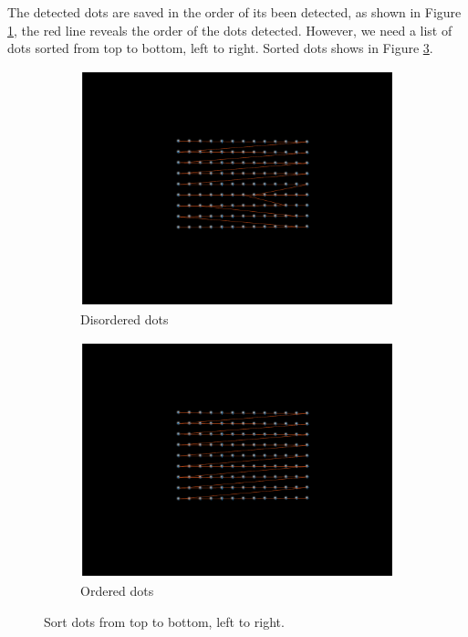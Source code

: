 The detected dots are saved in the order of its been detected, as shown in Figure \ref{fig:dot_disorder}, the red line reveals the order of the dots detected. However, we need a list of dots sorted from top to bottom, left to right. Sorted dots shows in Figure \ref{fig:dot_ordered}.

\begin{figure}[h!]
	\centering
	\begin{subfigure}[t]{0.48\linewidth}
		\centering
		\includegraphics[width=1\linewidth]{figures/part2/dot_disorder.eps}
		\caption{Disordered dots}
		\label{fig:dot_disorder}
	\end{subfigure}
	\begin{subfigure}[t]{0.48\linewidth}
		\centering
		\includegraphics[width=1\linewidth]{figures/part2/dot_ordered.eps}
		\caption{Ordered dots}
		\label{fig:dot_ordered}
	\end{subfigure}
	\caption{Sort dots from top to bottom, left to right.}
\end{figure}

